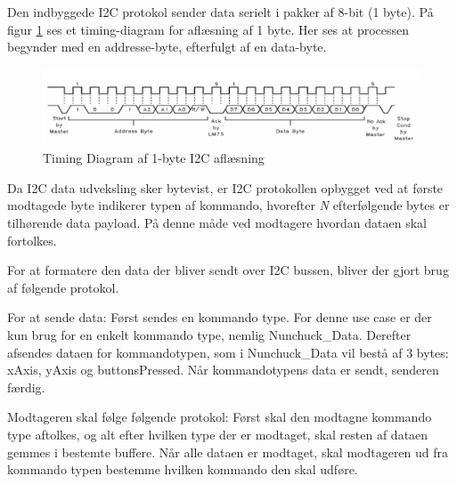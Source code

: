 Den indbyggede I2C protokol sender data serielt i pakker af 8-bit (1 byte). På figur \ref{fig:I2CTimingDiagram} ses et timing-diagram for aflæsning af 1 byte. Her ses at processen  begynder med en addresse-byte, efterfulgt af en data-byte. 

\begin{figure}[H]
	\centering
	\includegraphics[width=\textwidth] {Systemarkitektur/images/I2CTimingDiagram}
	\caption{Timing Diagram af 1-byte I2C aflæsning}
	\label{fig:I2CTimingDiagram}
\end{figure}

Da I2C data udveksling sker bytevist, er I2C protokollen opbygget ved at første modtagede byte indikerer typen af kommando, hvorefter \textit{N} efterfølgende bytes er tilhørende data payload. På denne måde ved modtagere hvordan dataen skal fortolkes.

For at formatere den data der bliver sendt over I2C bussen, bliver der gjort brug af følgende protokol.

For at sende data:
Først sendes en kommando type. For denne use case er der kun brug for en enkelt kommando type, nemlig Nunchuck\_Data. Derefter afsendes dataen for kommandotypen, som i Nunchuck\_Data vil bestå af 3 bytes: xAxis, yAxis og buttonsPressed. Når kommandotypens data er sendt, senderen færdig. 

Modtageren skal følge følgende protokol:
Først skal den modtagne kommando type aftolkes, og alt efter hvilken type der er modtaget, skal resten af dataen gemmes i bestemte buffere. Når alle dataen er modtaget, skal modtageren ud fra kommando typen bestemme hvilken kommando den skal udføre. 




